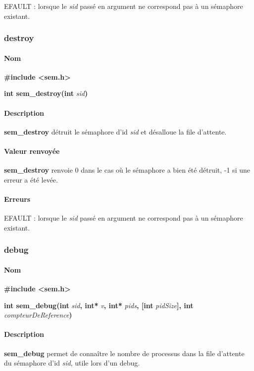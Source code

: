 \documentclass[12pt]{article}
\begin{document}
          EFAULT : lorsque le \textit{sid} passé en argument ne correspond pas à un sémaphore existant.
      \newpage
      \subsubsection{destroy}
          \paragraph{Nom\\}
          \textbf{\#include <sem.h>}

          \textbf{int sem\_destroy(int} \textit{sid}\textbf{)}
          \paragraph{Description\\}
          \textbf{sem\_destroy} détruit le sémaphore d'id \textit{sid} et désalloue la file d'attente.

          \paragraph{Valeur renvoyée\\}
          \textbf{sem\_destroy} renvoie 0 dans le cas où le sémaphore a bien été détruit, -1 si une erreur a été levée.
          \paragraph{Erreurs\\}
          EFAULT : lorsque le \textit{sid} passé en argument ne correspond pas à un sémaphore existant.
        \newpage
        \subsubsection{debug}
            \paragraph{Nom\\}
            \textbf{\#include <sem.h>}

            \textbf{int sem\_debug(int} \textit{sid}\textbf{, int* }\textit{v}\textbf{, int* }\textit{pids}\textbf{, [int }\textit{pidSize}\textbf{], int }\textit{compteurDeReference}\textbf{)}
            \paragraph{Description\\}
            \textbf{sem\_debug} permet de connaître le nombre de processus dans la file d'attente du sémaphore d'id \textit{sid}, utile lors d'un debug.
\end{document}
